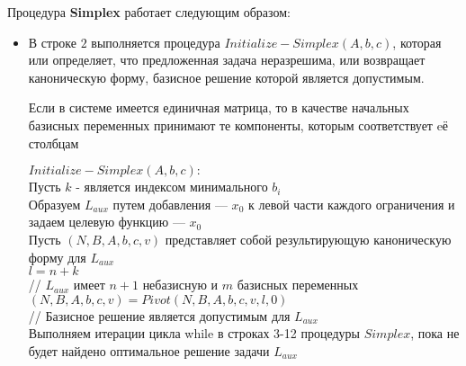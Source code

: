 \documentclass[../body.tex]{subfiles}
\begin{document}
Процедура \textbf{Simplex} работает следующим образом:
\begin{itemize}
	\item В строке $2$ выполняется процедура $Initialize-Simplex(A,b,c)$, которая или определяет, что предложенная задача неразрешима, или возвращает каноническую форму, базисное решение которой является допустимым.
	
	 Если в системе имеется единичная матрица, то в качестве начальных базисных переменных принимают те компоненты, которым соответствует eё столбцам\\
	 
	 	\begin{algorithm}[H]
	 	\textbf{$Initialize-Sim plex(A,b,c):$}\\
	 	Пусть $k$ - является индексом минимального $b_i$\\
	 	Образуем $  L_{aux}$ путем добавления — $x_{0}$ к левой части каждого
	 	ограничения и задаем целевую функцию — $x_{0}$\\
	 	Пусть $(N,B,A,b,c,v)$ представляет собой результирующую
	 	каноническую форму для $L_{aux}$
\\
	 	$l = n + k$\\
	 	// $L_{aux}$ имеет $n+1$ небазисную и $ m $ базисных переменных\\
	 	$(N ,B ,A ,b ,c ,v ) = Pivot(N,B, A ,b ,c ,v ,l,0 )$\\
	 	// Базисное решение является допустимым для $L_{aux}$ \\
	 	Выполняем итерации цикла while в строках 3-12 процедуры
	 	$Simplex$, пока не будет найдено оптимальное решение
	 	задачи $L_{aux}$
\\
\end{algorithm}
\end{itemize}
\end{document}
